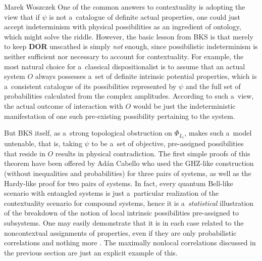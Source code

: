 \begin{artengenv}{Marek Woszczek}
One of the common answers to contextuality is adopting the view that if $\psi$ is not a~catalogue of definite actual properties, one could just accept indeterminism with physical possibilities as an ingredient of ontology, which might solve the riddle. However, the basic lesson from BKS is that merely to keep \textbf{DOR} unscathed is simply \textit{not} enough, since possibilistic indeterminism is neither sufficient nor necessary to account for contextuality. For example, the most natural choice for a~classical dispositionalist is to assume that an actual system $O$ always possesses a~set of definite intrinsic potential properties, which is a~consistent catalogue of its possibilities represented by $\psi$ and the full set of probabilities calculated from the complex amplitudes. According to such a~view, the actual outcome of interaction with $O$ would be just the indeterministic manifestation of one such pre-existing possibility pertaining to the system.

But BKS itself, as a~strong topological obstruction on $\Phi_{L_i}$, makes such a~model untenable, that is, taking $\psi $ to be a~set of objective, pre-assigned possibilities that reside in $O$ results in physical contradiction. The first simple proofs of this theorem have been offered by Adán Cabello
\parencite[][]{cabello_quantum_1999-1} %
 who used the GHZ-like construction (without inequalities and probabilities) for three pairs of systems, as well as the Hardy-like proof for two pairs of systems. In fact, every quantum Bell-like scenario with entangled systems is just a~particular realization of the contextuality scenario for compound systems, hence it is a~\textit{statistical} illustration of the breakdown of the notion of local intrinsic possibilities pre-assigned to subsystems. One may easily demonstrate that it is in each case related to the noncontextual assignments of properties, even if they are only probabilistic correlations and nothing more 
\parencite[][]{cabello_quantum_1999}. %
 The maximally nonlocal correlations discussed in the previous section are just an explicit example of this.


\end{artengenv}

